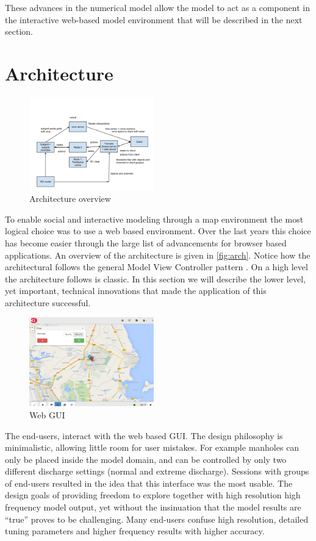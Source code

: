 \documentclass[a4paper]{article}
\begin{document}
%
These advances in the numerical model allow the model to act as a component in the interactive web-based model environment that will be described in the next section.

\section{Architecture}
\begin{figure}
  \centering
  \includegraphics[width=0.48\textwidth]{architecture}
  \caption{Architecture overview}
  \label{fig:arch}
\end{figure}

To enable social and interactive modeling through a map environment the most logical choice was to use a web based environment. Over the last years this choice has become easier through the large list of advancements for browser based applications.  An overview of the architecture is given in \autoref{fig:arch}. Notice how the architectural follows the general Model View Controller pattern \citep{GOF2004}. On a high level the architecture follows is classic. In this section we will describe the lower level, yet important,  technical innovations that made the application of this architecture successful.

\begin{figure}
  \centering
  \includegraphics[width=0.48\textwidth]{webgui}
  \caption{Web \ac{GUI}}
  \label{fig:gui}
\end{figure}

The end-users, interact with the web based \ac{GUI}. The design philosophy is minimalistic, allowing little room for user mistakes. For example manholes can only be placed inside the model domain, and can be controlled by only two different discharge settings (normal and extreme discharge). Sessions with groups of end-users resulted in the idea that this interface was the most usable. The design goals of providing freedom to explore together with high resolution high frequency model output, yet without the insinuation that the model results are ``true'' proves to be challenging. Many end-users confuse high resolution, detailed tuning parameters and higher frequency results with higher accuracy.
\end{document}
